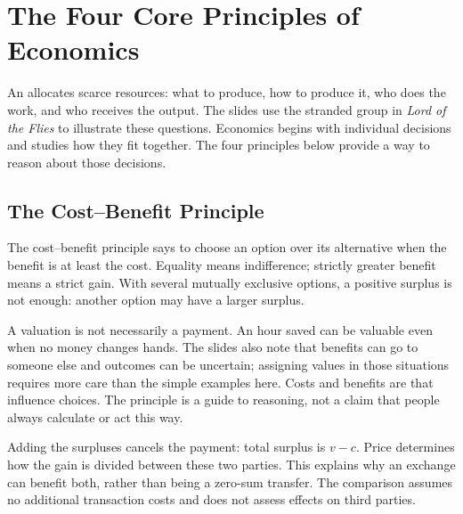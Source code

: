 \section{The Four Core Principles of Economics}
An  allocates scarce resources: what to produce, how to
produce it, who does the work, and who receives the output. The slides use
the stranded group in \emph{Lord of the Flies} to illustrate these questions.
Economics begins with individual decisions and studies how they fit together.
The four principles below provide a way to reason about those decisions.

\subsection{The Cost--Benefit Principle}
The cost--benefit principle says to choose an option over its alternative
when the benefit is at least the cost. Equality means indifference;
strictly greater benefit means a strict gain. With several mutually
exclusive options, a positive surplus is not enough: another option may
have a larger surplus.

A valuation is not necessarily a payment. An hour saved can be valuable
even when no money changes hands. The slides also note that benefits can
go to someone else and outcomes can be uncertain; assigning values in
those situations requires more care than the simple examples here.
Costs and benefits are  that influence choices.
The principle is a guide to reasoning, not a claim that people always
calculate or act this way.

Adding the surpluses cancels the payment: total surplus is $v-c$.
Price determines how the gain is divided between these two parties.
This explains why an exchange can benefit both, rather than being a
zero-sum transfer. The comparison assumes no additional transaction
costs and does not assess effects on third parties.

